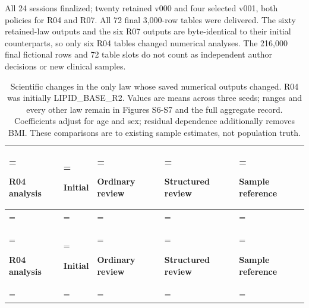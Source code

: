 \documentclass[11pt,letterpaper]{article}
\begin{document}
All 24 sessions finalized; twenty retained v000 and four selected v001, both policies for R04 and R07. All 72 final 3,000-row tables were delivered. The sixty retained-law outputs and the six R07 outputs are byte-identical to their initial counterparts, so only six R04 tables changed numerical analyses. The 216,000 final fictional rows and 72 table slots do not count as independent author decisions or new clinical samples.


\FloatBarrier

\begingroup

\small

\renewcommand{\arraystretch}{1.22}

\begin{xltabular}{\linewidth}{@{}>{\hsize\linewidth=\hsize\raggedright\arraybackslash}X>{\hsize\linewidth=\hsize\raggedright\arraybackslash}X>{\hsize\linewidth=\hsize\raggedright\arraybackslash}X>{\hsize\linewidth=\hsize\raggedright\arraybackslash}X>{\hsize\linewidth=\hsize\raggedright\arraybackslash}X@{}}

\caption{Scientific changes in the only law whose saved numerical outputs changed. R04 was initially LIPID\_BASE\_R2. Values are means across three seeds; ranges and every other law remain in Figures S6-S7 and the full aggregate record. Coefficients adjust for age and sex; residual dependence additionally removes BMI. These comparisons are to existing sample estimates, not population truth.}\label{tab:27} \\

\toprule

\textbf{R04 analysis} & \textbf{Initial} & \textbf{Ordinary review} & \textbf{Structured review} & \textbf{Sample reference} \\

\midrule

\endfirsthead

\\

\toprule

\textbf{R04 analysis} & \textbf{Initial} & \textbf{Ordinary review} & \textbf{Structured review} & \textbf{Sample reference} \\

\midrule

\endhead

\bottomrule

\endfoot


\end{xltabular}
\end{document}
